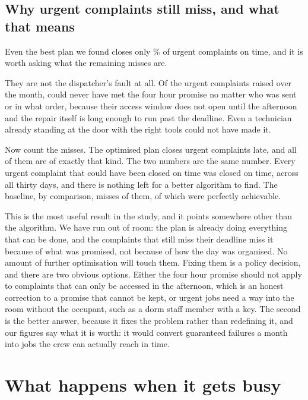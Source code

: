 \documentclass[11pt]{article}
\begin{document}
\subsection{Why urgent complaints still miss, and what that means}

Even the best plan we found closes only \NImpUrgent\% of urgent complaints on
time, and it is worth asking what the remaining \NImpUrgentLate{} misses are.

They are not the dispatcher's fault at all. Of the \NUrgentTotal{} urgent
complaints raised over the month, \NUrgentImpossible{} could never have met
the four hour promise no matter who was sent or in what order, because their
access window does not open until the afternoon and the repair itself is long
enough to run past the deadline. Even a technician already standing at the
door with the right tools could not have made it.

Now count the misses. The optimised plan closes \NImpUrgentLate{} urgent
complaints late, and all \NImpUrgentUnavoidable{} of them are of exactly that
kind. The two numbers are the same number. Every urgent complaint that could
have been closed on time was closed on time, across all thirty days, and
there is nothing left for a better algorithm to find. The baseline, by
comparison, misses \NFifoUrgentLate{} of them, of which
\NFifoUrgentAvoidable{} were perfectly achievable.

This is the most useful result in the study, and it points somewhere other
than the algorithm. We have run out of room: the plan is already doing
everything that can be done, and the complaints that still miss their
deadline miss it because of what was promised, not because of how the day was
organised. No amount of further optimisation will touch them. Fixing them is
a policy decision, and there are two obvious options. Either the four hour
promise should not apply to complaints that can only be accessed in the
afternoon, which is an honest correction to a promise that cannot be kept, or
urgent jobs need a way into the room without the occupant, such as a dorm
staff member with a key. The second is the better answer, because it fixes
the problem rather than redefining it, and our figures say what it is worth:
it would convert \NUrgentImpossible{} guaranteed failures a month into jobs
the crew can actually reach in time.

\section{What happens when it gets busy}
\end{document}
